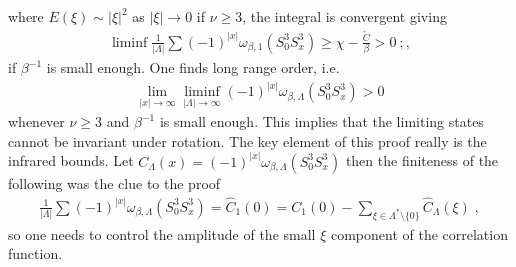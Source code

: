 \documentclass[
a4paper, %
11pt, %
onecolumn, %
openany, %
]{memoir}
\theoremstyle{definition}
\theoremstyle{remark}
\theoremstyle{plain}
\begin{document}
where $E(\xi)\sim |\xi|^2$ as $|\xi|\rightarrow 0$ if $\nu\geq 3$, the integral is convergent giving \begin{align}
\liminf \frac{1}{|\Lambda|}\sum(-1)^{|x|}\omega_{\beta,1}(S_0^3S_x^3)\geq \chi - \frac{\tilde{C}}{\beta}> 0\ ;, 
\end{align} 
if $\beta^{-1}$ is small enough. One finds long range order, i.e. \begin{align}\lim_{|x|\rightarrow\infty}\liminf_{|\Lambda|\rightarrow\infty} (-1)^{|x|}\omega_{\beta,\Lambda}(S_0^3S_x^3)>0\end{align}whenever $\nu\geq 3$ and $\beta^{-1}$ is small enough. This implies that the limiting states cannot be invariant under rotation. The key element of this proof really is the infrared bounds. Let $C_{\Lambda}(x)=(-1)^{|x|}\omega_{\beta,\Lambda}(S_0^3S_x^3)$ then the finiteness of the following was the clue to the proof \begin{align}
\frac{1}{|\Lambda|}\sum (-1)^{|x|}\omega_{\beta,\Lambda}(S_0^3S_x^3)=\hat{C}_1(0)=C_1(0)-\sum_{\xi\in\Lambda^*\setminus\{0\}}\hat{C}_{\Lambda}(\xi)\; ,
\end{align}
so one needs to control the amplitude of the small $\xi$ component of the correlation function.
\backmatter
\end{document}
